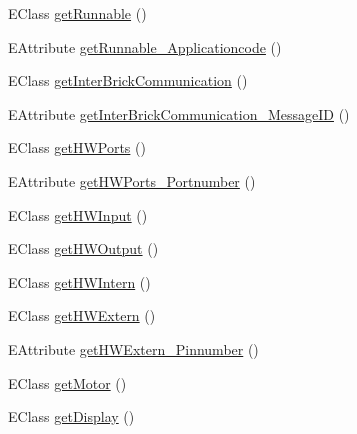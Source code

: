 \begin{DoxyCompactItemize}
E\-Class \hyperlink{interfaceshootingmachineemfmodel_1_1_shootingmachineemfmodel_package_a65dad4ef70cda2d24fe685c2da5a894c}{get\-Runnable} ()
\item 
E\-Attribute \hyperlink{interfaceshootingmachineemfmodel_1_1_shootingmachineemfmodel_package_a497701a2cbe3b3a45fcb9c9db7c60617}{get\-Runnable\-\_\-\-Applicationcode} ()
\item 
E\-Class \hyperlink{interfaceshootingmachineemfmodel_1_1_shootingmachineemfmodel_package_a07ac73133496e66edfbf6580ef5e8072}{get\-Inter\-Brick\-Communication} ()
\item 
E\-Attribute \hyperlink{interfaceshootingmachineemfmodel_1_1_shootingmachineemfmodel_package_a91c0d467979c6de78aae8b3b31741fc6}{get\-Inter\-Brick\-Communication\-\_\-\-Message\-I\-D} ()
\item 
E\-Class \hyperlink{interfaceshootingmachineemfmodel_1_1_shootingmachineemfmodel_package_a61f991dc891f5f2bb2bed180315251ca}{get\-H\-W\-Ports} ()
\item 
E\-Attribute \hyperlink{interfaceshootingmachineemfmodel_1_1_shootingmachineemfmodel_package_aed948671ec22a9979acaf83742119868}{get\-H\-W\-Ports\-\_\-\-Portnumber} ()
\item 
E\-Class \hyperlink{interfaceshootingmachineemfmodel_1_1_shootingmachineemfmodel_package_a300f22d97187e71008e38fcdc44814bc}{get\-H\-W\-Input} ()
\item 
E\-Class \hyperlink{interfaceshootingmachineemfmodel_1_1_shootingmachineemfmodel_package_a2af0244950d949bae77dfe7e98015249}{get\-H\-W\-Output} ()
\item 
E\-Class \hyperlink{interfaceshootingmachineemfmodel_1_1_shootingmachineemfmodel_package_a44d43825d205aa22ca7b8ac2cfaef00d}{get\-H\-W\-Intern} ()
\item 
E\-Class \hyperlink{interfaceshootingmachineemfmodel_1_1_shootingmachineemfmodel_package_ac8be9580bc0261e1ab46e4d596cba73a}{get\-H\-W\-Extern} ()
\item 
E\-Attribute \hyperlink{interfaceshootingmachineemfmodel_1_1_shootingmachineemfmodel_package_a68016873106c1b2c0291270a0e3a540f}{get\-H\-W\-Extern\-\_\-\-Pinnumber} ()
\item 
E\-Class \hyperlink{interfaceshootingmachineemfmodel_1_1_shootingmachineemfmodel_package_a1d805c5360001d5b59912ffffce76733}{get\-Motor} ()
\item 
E\-Class \hyperlink{interfaceshootingmachineemfmodel_1_1_shootingmachineemfmodel_package_aa6b8937df7496f782eef12f9112a0544}{get\-Display} ()
\item 

\end{DoxyCompactItemize}
